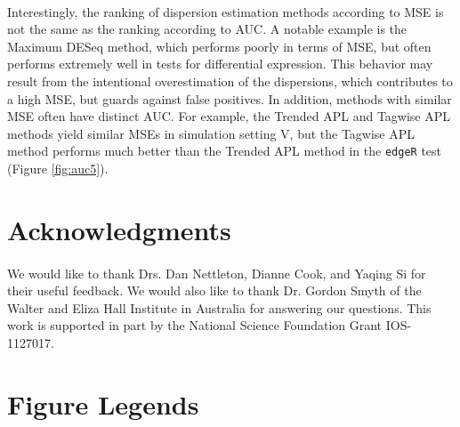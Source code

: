 \documentclass[10pt]{article}
\begin{document}
\paragraph{} \indent Interestingly, the ranking of dispersion estimation methods according to MSE is not the same as the ranking according to AUC. A notable example is the Maximum DESeq method, which performs poorly in terms of MSE, but often performs extremely well in tests for differential expression. This behavior may result from the intentional overestimation of the dispersions, which contributes to a high MSE, but guards against false positives. In addition, methods with similar MSE often have distinct AUC. For example, the Trended APL and Tagwise APL methods yield similar MSEs in simulation setting V, but the Tagwise APL method performs much better than the Trended APL method in the {\tt edgeR} test (Figure \ref{fig:auc5}). 

\section*{Acknowledgments}

\paragraph{} \indent We would like to thank Drs. Dan Nettleton, Dianne Cook, and Yaqing Si for their useful feedback. We would also like to thank Dr. Gordon Smyth of the Walter and Eliza Hall Institute in Australia for answering our questions. This work is supported in part by the National Science Foundation Grant IOS-1127017. %




\section*{Figure Legends}
\end{document}
